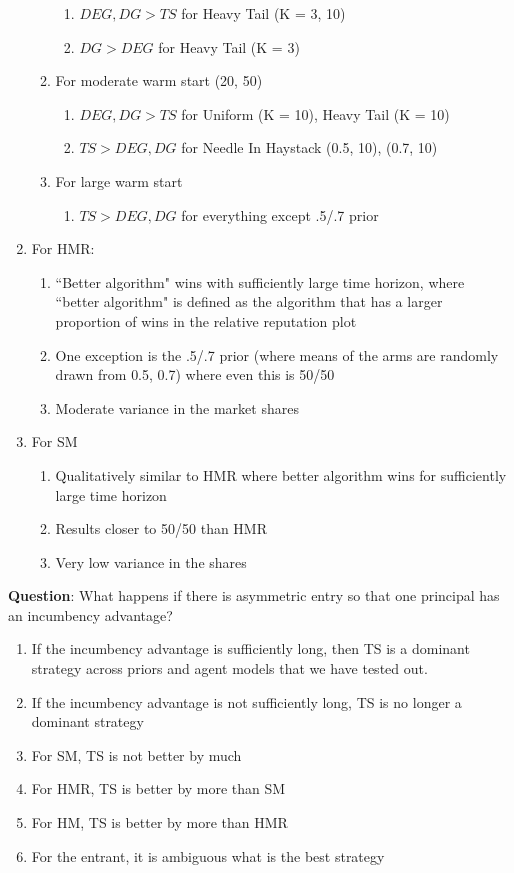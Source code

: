 \documentclass[11pt,letterpaper]{article}
\begin{document}
\begin{enumerate}
\begin{enumerate}
\begin{enumerate}
\item $DEG, DG > TS$ for Heavy Tail (K = 3, 10)
\item $DG > DEG$ for Heavy Tail (K = 3)
\end{enumerate}
\item For moderate warm start (20, 50)
\begin{enumerate}
\item $DEG, DG > TS$ for Uniform (K = 10), Heavy Tail (K = 10)
\item $TS > DEG, DG$ for Needle In Haystack (0.5, 10), (0.7, 10)
\end{enumerate}
\item For large warm start
\begin{enumerate}
\item $TS > DEG, DG$ for everything except .5/.7 prior
\end{enumerate}
\end{enumerate}

\item For HMR:
\begin{enumerate}
\item ``Better algorithm" wins with sufficiently large time horizon, where ``better algorithm" is defined as the algorithm that has a larger proportion of wins in the relative reputation plot
\item One exception is the .5/.7 prior (where means of the arms are randomly drawn from {0.5, 0.7}) where even this is 50/50
\item Moderate variance in the market shares
\end{enumerate}
\item For SM

\begin{enumerate}
\item Qualitatively similar to HMR where better algorithm wins for sufficiently large time horizon
\item Results closer to 50/50 than HMR
\item Very low variance in the shares
\end{enumerate}

\end{enumerate}

\textbf{Question}: What happens if there is asymmetric entry so that one principal has an incumbency advantage?

\begin{enumerate}
\item If the incumbency advantage is sufficiently long, then TS is a dominant strategy across priors and agent models that we have tested out.
\item If the incumbency advantage is not sufficiently long, TS is no longer a dominant strategy
\item For SM, TS is not better by much
\item For HMR, TS is better by more than SM
\item For HM, TS is better by more than HMR
\item For the entrant, it is ambiguous what is the best strategy
\end{enumerate}
\end{document}
